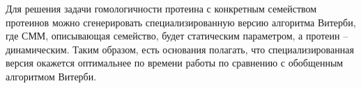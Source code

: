 Для решения задачи гомологичности протеина с конкретным семейством протеинов 
можно сгенерировать специализированную версию алгоритма Витерби,
где СММ, описывающая семейство, будет статическим параметром, 
а протеин -- динамическим.
Таким образом, есть основания полагать, что специализированная версия окажется 
оптимальнее по времени работы по сравнению с обобщенным алгоритмом Витерби.
